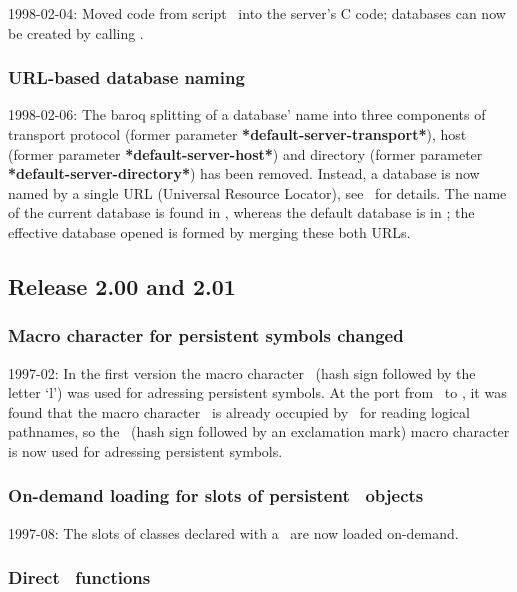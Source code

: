 1998-02-04: Moved code from script \ into the
server's C code; databases can now be created by calling
.

\subsubsection{URL-based database naming}

1998-02-06: The baroq splitting of a database' name into three
components of transport protocol (former parameter
\textbf{*default-server-transport*}), host (former parameter
\textbf{*default-server-host*}) and directory (former parameter
\textbf{*default-server-directory*}) has been removed. Instead, a
database is now named by a single URL (Universal Resource Locator),
see \ for details. The name of the current database is
found in , whereas the default database is in
; the effective database opened is
formed by merging these both URLs.

\subsection{Release 2.00 and 2.01}

\subsubsection{Macro character for persistent symbols changed}

1997-02: In the first version the macro character \ (hash
sign followed by the letter `l') was used for adressing persistent
symbols.  At the port from \lw\ to \allegro, it was found that the
macro character \ is already occupied by \allegro\ for
reading logical pathnames, so the \lisp{\#!}\ (hash sign followed by
an exclamation mark) macro character is now used for adressing
persistent symbols.

\subsubsection[On-demand loading for slots of CLOS objects]{On-demand
  loading for slots of persistent \protect\clos\ objects}

1997-08: The slots of classes declared with a
\hspace{\lispblank}\ are
now loaded on-demand.

\subsubsection[Direct `p-...' functions]{Direct \protect{}\
  functions}

